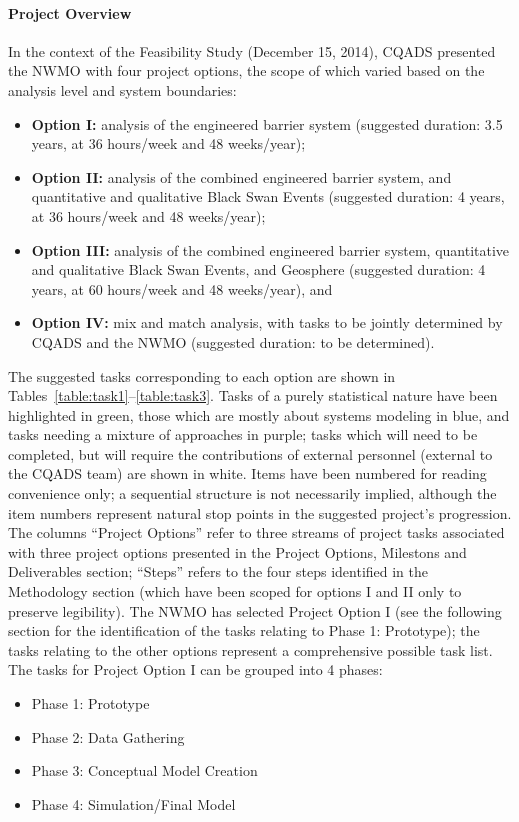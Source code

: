 \paragraph{Project Overview} In the context of the Feasibility Study (December 15, 2014), CQADS presented the NWMO with four project options, the scope of which varied based on the analysis level and system boundaries:  
\begin{itemize}[noitemsep]
\item \textbf{Option I:} analysis of the engineered barrier system (suggested duration: 3.5 years, at 36 hours/week and 48 weeks/year);
\item \textbf{Option II:} analysis of the combined engineered barrier system, and quantitative and qualitative Black Swan Events (suggested duration: 4 years, at 36 hours/week and 48 weeks/year);
\item \textbf{Option III:} analysis of the combined engineered barrier system, quantitative and qualitative Black Swan Events, and Geosphere (suggested duration: 4 years, at 60 hours/week and 48 weeks/year), and
\item \textbf{Option IV:} mix and match analysis, with tasks to be jointly determined by CQADS and the NWMO (suggested duration: to be determined).
\end{itemize}
The suggested tasks corresponding to each option are shown in Tables~\ref{table:task1}--\ref{table:task3}. Tasks of a purely statistical nature have been highlighted in green, those which are mostly about systems modeling in blue, and tasks needing a mixture of approaches in purple; tasks which will need to be completed, but will require the contributions of external personnel (external to the CQADS team) are shown in white. Items have been numbered for reading convenience only; a sequential structure is not necessarily implied, although the item numbers represent natural stop points in the suggested project's progression. \newl The columns ``Project Options'' refer to three streams of project tasks associated with three project options presented in the Project Options, Milestons and Deliverables section; ``Steps'' refers to the four steps identified in the Methodology section (which have been scoped for options I and II only to preserve legibility).  \newl The NWMO has selected Project Option I (see the following section for the identification of the tasks relating to Phase 1: Prototype); the tasks relating to the other options represent a comprehensive possible task list. The tasks for Project Option I can be grouped into 4 phases: \begin{itemize}[noitemsep]
\item Phase 1: Prototype
\item Phase 2: Data Gathering
\item Phase 3: Conceptual Model Creation
\item Phase 4: Simulation/Final Model 
\end{itemize}
